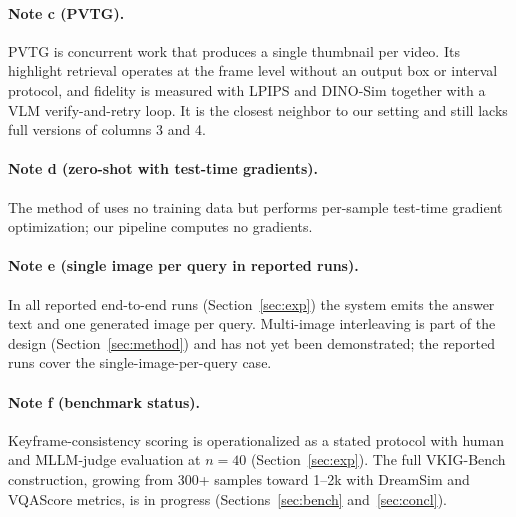 \paragraph{Note c (PVTG).}
PVTG \citep{pvtg2607} is concurrent work that produces a single thumbnail per video. Its highlight retrieval operates at the frame level without an output box or interval protocol, and fidelity is measured with LPIPS and DINO-Sim together with a VLM verify-and-retry loop. It is the closest neighbor to our setting and still lacks full versions of columns 3 and 4.

\paragraph{Note d (zero-shot with test-time gradients).}
The method of \citet{zeroshotstvg2509} uses no training data but performs per-sample test-time gradient optimization; our pipeline computes no gradients.

\paragraph{Note e (single image per query in reported runs).}
In all reported end-to-end runs (Section~\ref{sec:exp}) the system emits the answer text and one generated image per query. Multi-image interleaving is part of the design (Section~\ref{sec:method}) and has not yet been demonstrated; the reported runs cover the single-image-per-query case.

\paragraph{Note f (benchmark status).}
Keyframe-consistency scoring is operationalized as a stated protocol with human and MLLM-judge evaluation at $n=40$ (Section~\ref{sec:exp}). The full VKIG-Bench construction, growing from 300+ samples toward 1--2k with DreamSim and VQAScore metrics, is in progress (Sections~\ref{sec:bench} and~\ref{sec:concl}).
